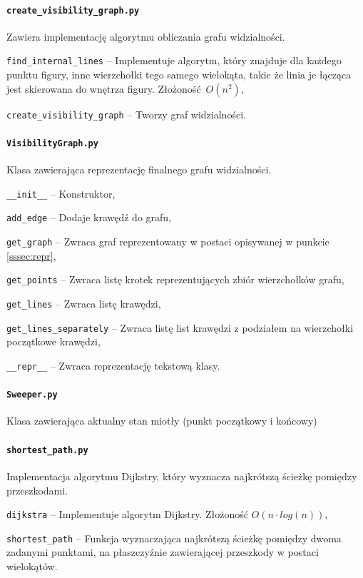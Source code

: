 \documentclass[12pt]{article}
\let\tempone\itemize
\let\temptwo\enditemize
\renewenvironment{itemize}{\tempone\setlength{\itemsep}{0cm}}{\temptwo}
\begin{document}
	\paragraph{\lstinline|create_visibility_graph.py|}
		Zawiera implementację algorytmu obliczania grafu widzialności.
		\begin{itemize}
			\item \lstinline|find_internal_lines| -- Implementuje algorytm, który znajduje dla każdego punktu figury, inne wierzchołki tego samego wielokąta, takie że linia je łącząca jest skierowana do wnętrza figury. Złożoność $ O(n^2) $,
			\item \lstinline|create_visibility_graph| -- Tworzy graf  widzialności.
		\end{itemize}
	
	\paragraph{\lstinline|VisibilityGraph.py|}
		Klasa zawierająca reprezentację finalnego grafu widzialności.
		\begin{itemize}
			\item \lstinline|__init__| -- Konstruktor,
			\item \lstinline|add_edge| -- Dodaje krawędź do grafu,
			\item \lstinline|get_graph| -- Zwraca graf reprezentowany w postaci opisywanej w punkcie \ref{sssec:repr},
			\item \lstinline|get_points| -- Zwraca listę krotek reprezentujących zbiór wierzchołków grafu,
			\item \lstinline|get_lines| -- Zwraca listę krawędzi,
			\item \lstinline|get_lines_separately| -- Zwraca listę list krawędzi z podziałem na wierzchołki początkowe krawędzi,
			\item \lstinline|__repr__| -- Zwraca reprezentację tekstową klasy.
		\end{itemize}
	
	\paragraph{\lstinline|Sweeper.py|}
		Klasa zawierająca aktualny stan miotły (punkt początkowy i końcowy)
	
	\paragraph{\lstinline|shortest_path.py|}
		Implementacja algorytmu Dijkstry, który wyznacza najkrótszą ścieżkę pomiędzy przeszkodami.
		\begin{itemize}
			\item \lstinline|dijkstra| -- Implementuje algorytm Dijkstry. Złożoność $ O(n \cdot log(n)) $,
			\item \lstinline|shortest_path| -- Funkcja wyznaczająca najkrótszą ścieżkę pomiędzy dwoma zadanymi punktami, na płaszczyźnie zawierającej przeszkody w postaci wielokątów.
		\end{itemize}
	
\end{document}
